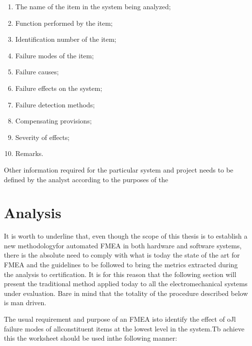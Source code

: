 \documentclass[./dissertation.tex]{subfiles}
\begin{document}
\begin{enumerate}
\item The name of the item in the system being analyzed;
\item Function performed by the item;
\item Identification number of the item;
\item Failure modes of the item;
\item Failure causes;
\item Failure effects on the system;
\item Failure detection methods;
\item Compensating provisions;
\item Severity of effects;
\item Remarks.
\end{enumerate}
Other information required for the particular system and project needs to be defined by the analyst according to the purposes of the



\section{Analysis}
It is worth to underline that, even though the scope of this thesis is to establish a new methodologyfor automated FMEA in both hardware and software systems, there is the absolute need to comply with what is today the state of the art for FMEA and the guidelines to be followed to bring the metrics extracted during the analysis to certification. It is for this reason that the following section will present the traditional method applied today to all the electromechanical systems under evaluation. Bare in mind that the totality of the procedure described below is man driven.

The usual requirement and purpose of an FMEA isto identify the effect of oJl failure modes of allconstituent items at the lowest level in the system.Tb achieve this the worksheet should be used inthe following manner:
\end{document}
